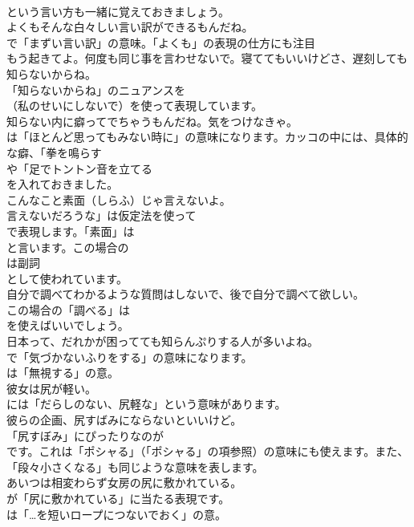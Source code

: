 \documentclass[8pt]{extreport}
\begin{document}
\begin{CJK}{UTF8}{min}
\\	という言い方も一緒に覚えておきましょう。	
\\	よくもそんな白々しい言い訳ができるもんだね。 
\\	で「まずい言い訳」の意味。「よくも」の表現の仕方にも注目
\\	もう起きてよ。何度も同じ事を言わせないで。寝ててもいいけどさ、遅刻しても知らないからね。 
\\	「知らないからね」のニュアンスを
\\	（私のせいにしないで）を使って表現しています。	
\\	知らない内に癖ってでちゃうもんだね。気をつけなきゃ。 
\\	は「ほとんど思ってもみない時に」の意味になります。カッコの中には、具体的な癖、「拳を鳴らす
\\	や「足でトントン音を立てる
\\	を入れておきました。	
\\	こんなこと素面（しらふ）じゃ言えないよ。 
\\	言えないだろうな」は仮定法を使って
\\	で表現します。「素面」は
\\	と言います。この場合の
\\	は副詞
\\	として使われています。	
\\	自分で調べてわかるような質問はしないで、後で自分で調べて欲しい。 
\\	この場合の「調べる」は
\\	を使えばいいでしょう。	
\\	日本って、だれかが困ってても知らんぷりする人が多いよね。 
\\	で「気づかないふりをする」の意味になります。
\\	は「無視する」の意。	
\\	彼女は尻が軽い。 
\\	には「だらしのない、尻軽な」という意味があります。	
\\	彼らの企画、尻すばみにならないといいけど。 
\\	「尻すぼみ」にぴったりなのが
\\	です。これは「ポシャる」（「ポシャる」の項参照）の意味にも使えます。また、
\\	「段々小さくなる」も同じような意味を表します。	
\\	あいつは相変わらず女房の尻に敷かれている。 
\\	が「尻に敷かれている」に当たる表現です。
\\	は「…を短いロープにつないでおく」の意。	

\end{CJK}
\end{document}
